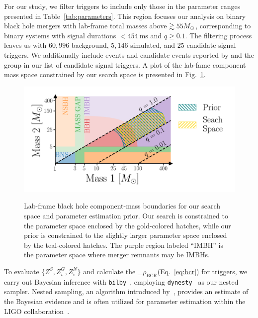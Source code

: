\documentclass[useAMS,fleqn, usenatbib, final]{mnras}
\newcommand{\code}[1]{{\texttt{#1}}\xspace}
\newcommand{\bilby}{\code{bilby}}
\newcommand{\dynesty}{\code{dynesty}}
\newcommand{\pycbc}{{\sc {{PyCBC}}}\xspace}
\newcommand{\GWTC}{{\sc {{GWTC-1}}}\xspace}
\newcommand{\IAS}{{\sc {{IAS}}}\xspace}
\newcommand{\mathcmd}[1]{{\sc \relax\ifmmode#1\else $#1$\fi}\xspace}
\newcommand{\bcr}{\mathcmd{\rho_\text{BCR}}}
\newcommand{\msun}{\mathcmd{M_\odot}}
\begin{document}
For our study, we filter \pycbc triggers to include only those in the parameter ranges presented in Table~\ref{tab:parameters}. This region focuses our analysis on binary black hole mergers with lab-frame total masses above ${\gtrsim55 \msun}$, corresponding to binary systems with signal durations $<454 \ \text{ms}$ and ${q\geq0.1}$. The filtering process leaves us with $60,996$ background, $5,146$ simulated, and $25$ candidate signal triggers. We additionally include events and candidate events reported by \GWTC and the \IAS group in our list of candidate signal triggers.  A plot of the lab-fame component mass space constrained by our search space is presented in Fig.~\ref{fig:templateBank}.

\begin{figure}
{\centering \includegraphics[width=0.75\linewidth]{images/template_bank.png}
}
\caption[ BCR search space.]{Lab-frame black hole component-mass boundaries for our search space and parameter estimation prior. Our search is constrained to the parameter space enclosed by the gold-colored hatches, while our prior is constrained to the slightly larger parameter space enclosed by the teal-colored hatches. The purple region labeled ``IMBH'' is the parameter space where merger remnants may be IMBHs.}\label{fig:templateBank}
\end{figure}


To evaluate $\{Z^S, Z^G_i, Z^N_i\}$ and calculate the \bcr (Eq.~\ref{eq:bcr}) for triggers, we carry out Bayesian inference with \bilby~\citep{bilby, bilby_pipe}, employing \dynesty~\citep{dynesty} as our nested sampler. Nested sampling, an algorithm introduced by~\citet{skilling2004, skilling2006}, provides an estimate of the Bayesian evidence and is often utilized for parameter estimation within the LIGO collaboration~\citep{bilby, bilby_paper, pbilby_paper}.
\end{document}
